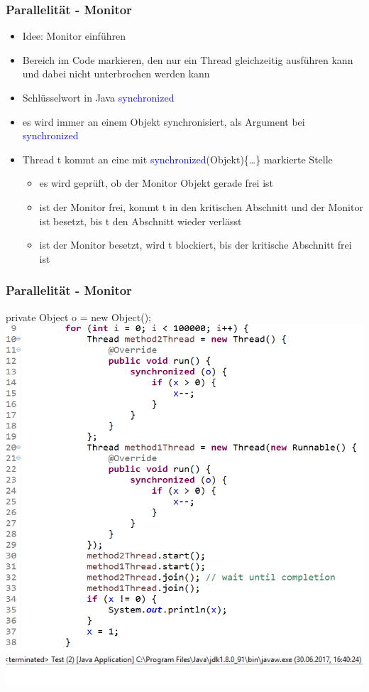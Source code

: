 \documentclass[18pt]{beamer}
\begin{document}
	\begin{frame}
		\frametitle{Parallelität - Monitor}
		\begin{itemize}
			\item Idee: Monitor einführen \pause
			\item Bereich im Code markieren, den nur ein Thread gleichzeitig ausführen kann und dabei nicht unterbrochen werden kann \pause
			\item Schlüsselwort in Java \textcolor{blue}{synchronized} \pause
			\item es wird immer an einem Objekt synchronisiert, als Argument bei \textcolor{blue}{synchronized} \pause
			\item Thread t kommt an eine mit \textcolor{blue}{synchronized}(Objekt)\{\dots\} markierte Stelle \pause
			\begin{itemize}
				\item es wird geprüft, ob der Monitor Objekt gerade frei ist \pause
				\item ist der Monitor frei, kommt t in den kritischen Abschnitt und der Monitor ist besetzt, bis t den Abschnitt wieder verlässt \pause
				\item ist der Monitor besetzt, wird t blockiert, bis der kritische Abschnitt frei ist
			\end{itemize}
		\end{itemize}
	\end{frame}

	\begin{frame}
		\frametitle{Parallelität - Monitor}
		private Object o = new Object();
		\includegraphics[scale=0.36]{./pics/tut5/synch-ex3.png} \pause
		\includegraphics[scale=0.39]{./pics/tut5/synch-ex4.png}
	\end{frame}
\end{document}
